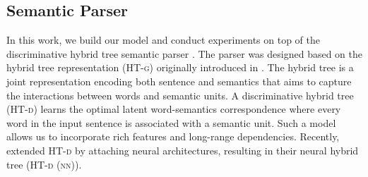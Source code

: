 \documentclass[11pt,a4paper]{article}
\begin{document}
{\subsection{Semantic Parser}
\label{sec:nht}

In this work, we build our model and conduct experiments on top of the discriminative hybrid tree semantic parser \cite{Luw:14,Luw:15}.
The parser was designed based on the hybrid tree representation ({\textsc{HT-g}}) originally introduced in \cite{Luw:08}.
The hybrid tree is a joint representation encoding both sentence and semantics that aims to capture the interactions between words and semantic units.
A discriminative hybrid tree ({\textsc{HT-d}}) \cite{Luw:14,Luw:15} learns the optimal latent word-semantics correspondence where every word in the input sentence is associated with a semantic unit.
Such a model allows us to incorporate rich features and long-range dependencies.
Recently,  extended {\textsc{HT-d}} by attaching neural architectures, resulting in their neural hybrid tree ({\textsc{HT-d} \textsc{(nn)}}). 

}
\end{document}
